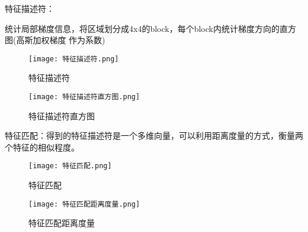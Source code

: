 特征描述符：

统计局部梯度信息，将区域划分成4x4的block，每个block内统计梯度方向的直方图(高斯加权梯度
作为系数)

\begin{figure}[h]
    \centering
    \texttt{[image: 特征描述符.png]}
    \caption{特征描述符}
\end{figure}


\begin{figure}[h]
    \centering
    \texttt{[image: 特征描述符直方图.png]}
    \caption{特征描述符直方图}
\end{figure}


特征匹配：得到的特征描述符是一个多维向量，可以利用距离度量的方式，衡量两个特征的相似程度。

\begin{figure}[h]
    \centering
    \texttt{[image: 特征匹配.png]}
    \caption{特征匹配}
\end{figure}

\begin{figure}[h]
    \centering
    \texttt{[image: 特征匹配距离度量.png]}
    \caption{特征匹配距离度量}
\end{figure}